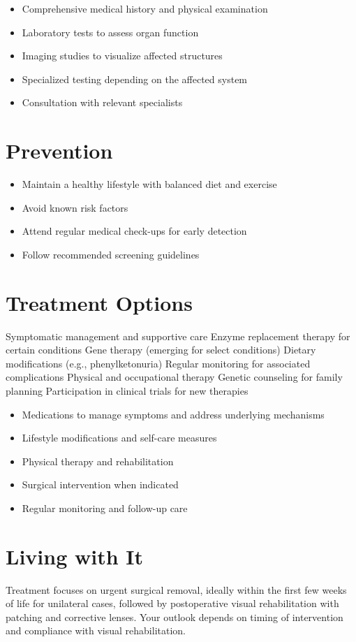 \begin{itemize}[noitemsep]
  \item Comprehensive medical history and physical examination
  \item Laboratory tests to assess organ function
  \item Imaging studies to visualize affected structures
  \item Specialized testing depending on the affected system
  \item Consultation with relevant specialists
\end{itemize}
\section{Prevention}
\begin{itemize}[noitemsep]
  \item Maintain a healthy lifestyle with balanced diet and exercise
  \item Avoid known risk factors
  \item Attend regular medical check-ups for early detection
  \item Follow recommended screening guidelines
\end{itemize}
\section{Treatment Options}
Symptomatic management and supportive care Enzyme replacement therapy for certain conditions Gene therapy (emerging for select conditions) Dietary modifications (e.g., phenylketonuria) Regular monitoring for associated complications Physical and occupational therapy Genetic counseling for family planning Participation in clinical trials for new therapies

\begin{itemize}[noitemsep]
  \item Medications to manage symptoms and address underlying mechanisms
  \item Lifestyle modifications and self-care measures
  \item Physical therapy and rehabilitation
  \item Surgical intervention when indicated
  \item Regular monitoring and follow-up care
\end{itemize}
\section{Living with It}
Treatment focuses on urgent surgical removal, ideally within the first few weeks of life for unilateral cases, followed by postoperative visual rehabilitation with patching and corrective lenses. Your outlook depends on timing of intervention and compliance with visual rehabilitation.

